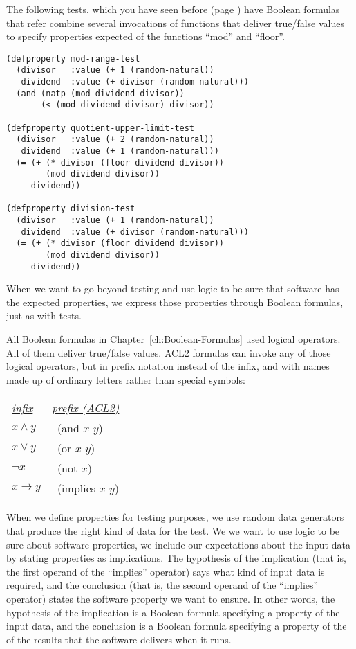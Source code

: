 The following tests, which you have seen before (page \pageref{quotient-upper-limit-test}) have Boolean formulas that refer combine several invocations of functions that deliver true/false values to specify properties expected of the functions ``mod'' and ``floor''.

\begin{lstlisting}
(defproperty mod-range-test
  (divisor   :value (+ 1 (random-natural))
   dividend  :value (+ divisor (random-natural)))
  (and (natp (mod dividend divisor))
       (< (mod dividend divisor) divisor))

(defproperty quotient-upper-limit-test
  (divisor   :value (+ 2 (random-natural))
   dividend  :value (+ 1 (random-natural)))
  (= (+ (* divisor (floor dividend divisor))
        (mod dividend divisor))
     dividend))

(defproperty division-test
  (divisor   :value (+ 1 (random-natural))
   dividend  :value (+ divisor (random-natural)))
  (= (+ (* divisor (floor dividend divisor))
        (mod dividend divisor))
     dividend))
\end{lstlisting}

When we want to go beyond testing and use logic to be sure that software has the expected properties, we express those properties through Boolean formulas, just as with tests.

All Boolean formulas in Chapter~\ref{ch:Boolean-Formulas} used logical operators. All of them deliver true/false values. ACL2 formulas can invoke any of those logical operators, but in prefix notation instead of the infix, and with names made up of ordinary letters rather than special symbols:

\begin{tabular}{ll}
 \emph{\underline{infix}}  & \emph{\underline{prefix (ACL2)}}   \\
 $x \wedge y$              & ~(and $x$ $y$)       \\
 $x \vee y$                & ~(or $x$ $y$)        \\
 $\neg x$                  & ~(not $x$)           \\
 $x \rightarrow y$         & ~(implies $x$ $y$)   \\
\end{tabular}

When we define properties for testing purposes, we use random data generators that produce the right kind of data for the test. We we want to use logic to be sure about software properties, we include our expectations about the input data by stating properties as implications. The hypothesis of the implication (that is, the first operand of the ``implies'' operator) says what kind of input data is required, and the conclusion (that is, the second operand of the ``implies'' operator) states the software property we want to ensure. In other words, the hypothesis of the implication is a Boolean formula specifying a property of the input data, and the conclusion is a Boolean formula specifying a property of the of the results that the software delivers when it runs.

